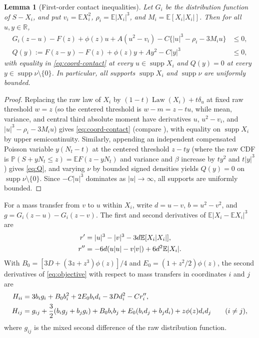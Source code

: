 \documentclass[11pt]{article}
\numberwithin{equation}{section}
\newtheorem{lemma}[theorem]{Lemma}
\theoremstyle{definition}
\DeclareMathOperator{\supp}{supp}
\DeclareMathOperator{\Law}{Law}
\newcommand{\E}{\mathbb E}
\newcommand{\Pp}{\mathbb P}
\newcommand{\R}{\mathbb R}
\begin{document}
\begin{lemma}[First-order contact inequalities]\label{lem:contacts}
Let $G_i$ be the distribution function of $S-X_i$, and put $v_i=\E X_i^2$,
$\rho_i=\E|X_i|^3$, and $M_i=\E[X_i|X_i|]$. Then for all $u,y\in\R$,
\begin{align}
 G_i(z-u)-F(z)+\phi(z)u+A(u^2-v_i)
   -C\{|u|^3-\rho_i-3M_i u\}&\le0,                    \label{eq:coord-contact}\\
 Q(y):=F(z-y)-F(z)+\phi(z)y+Ay^2-C|y|^3&\le0,       \label{eq:Q}
\end{align}
with equality in \eqref{eq:coord-contact} at every $u\in\supp X_i$ and
$Q(y)=0$ at every $y\in\supp\nu\setminus\{0\}$. In particular, all supports
$\supp X_i$ and $\supp\nu$ are uniformly bounded.
\end{lemma}
\begin{proof}
Replacing the raw law of $X_i$ by $(1-t)\Law(X_i)+t\delta_u$ at fixed raw
threshold $w=z$ (so the centered threshold is $w-m=z-tu$, while mean, variance,
and central third absolute moment have derivatives $u$, $u^2-v_i$, and
$|u|^3-\rho_i-3M_iu$) gives \eqref{eq:coord-contact} (compare
\citet[Lemma~4.3]{HeCheng2026}), with equality on $\supp X_i$ by upper
semicontinuity. Similarly, appending an independent compensated Poisson
variable $y(N_t-t)$ at the centered threshold $z-ty$ (where the raw CDF is
$\Pp(S+yN_t\le z)=\E F(z-yN_t)$ and variance and $\beta$ increase by $ty^2$
and $t|y|^3$) gives \eqref{eq:Q}, and varying $\nu$ by bounded signed
densities yields $Q(y)=0$ on $\supp\nu\setminus\{0\}$. Since $-C|u|^3$
dominates as $|u|\to\infty$, all supports are uniformly bounded.
\end{proof}

For a mass transfer from $v$ to $u$ within $X_i$, write $d=u-v$, $b=u^2-v^2$,
and $g=G_i(z-u)-G_i(z-v)$. The first and second derivatives of $\E|X_i-\E X_i|^3$
are
\begin{align}
 r'&=|u|^3-|v|^3-3d\E[X_i|X_i|],\notag\\
 r''&=-6d(u|u|-v|v|)+6d^2\E|X_i|.                  \label{eq:transfer-moments}
\end{align}
With $B_0=[3D+(3z+z^3)\phi(z)]/4$ and $E_0=(1+z^2/2)\phi(z)$, the second
derivatives of \eqref{eq:objective} with respect to mass transfers in
coordinates $i$ and $j$ are
\begin{align}
 H_{ii}&=3b_i g_i+B_0b_i^2+2E_0b_i d_i-3Dd_i^2-Cr_i'',\label{eq:prob-hessian}\\
 H_{ij}&=g_{ij}+\frac32(b_i g_j+b_j g_i)+B_0b_i b_j
      +E_0(b_i d_j+b_j d_i)+z\phi(z) d_i d_j\qquad(i\ne j),\notag
\end{align}
where $g_{ij}$ is the mixed second difference of the raw distribution function.
\end{document}
